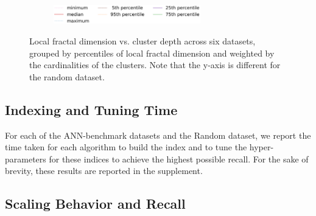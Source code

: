 \begin{figure}
\begin{subfigure}[b]{0.47\textwidth}
        \label{fig:results:radioml-lfd}
    \end{subfigure}%
    \\
    \vskip -0.1in
    \begin{subfigure}[b]{0.94\textwidth}
        \centering
        \includegraphics[width=0.7\textwidth]{images/lfd/legend.png}
        \label{fig:results:lfd-legend}
    \end{subfigure}%
    \vskip -0.1in
    \caption{Local fractal dimension vs. cluster depth across six datasets, grouped by percentiles of local fractal dimension and weighted by the cardinalities of the clusters.
    Note that the y-axis is different for the random dataset.}
    \label{fig:results:lfd-plots}
    \vskip -0.4in
\end{figure}


\subsection{Indexing and Tuning Time}
\label{sec:results:indexing-and-tuning-time}

For each of the ANN-benchmark datasets and the Random dataset, we report the time taken for each algorithm to build the index and to tune the hyper-parameters for these indices to achieve the highest possible recall. For the sake of brevity, these results are reported in the supplement.


\subsection{Scaling Behavior and Recall}
\label{sec:results:scaling-behavior-and-recall}

